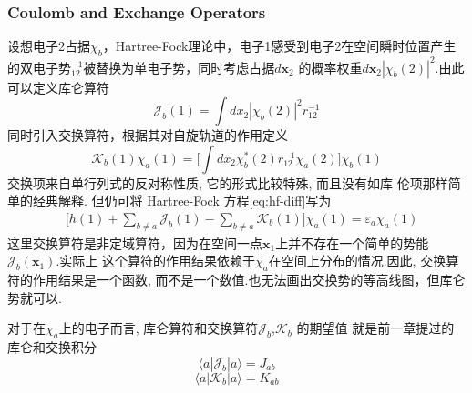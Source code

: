 \documentclass[fontset=none,12pt,a4paper]{ctexart}
\numberwithin{equation}{section}
\begin{document}
\subsubsection{Coulomb and Exchange Operators}
设想电子2占据$\chi_b$，Hartree-Fock理论中，电子1感受到电子2在空间瞬时位置产生的双电子势$_{12}^{-1}$被替换为单电子势，同时考虑占据$d\mathbf{x}_2$
的概率权重$d\mathbf{x}_2|\chi_b(2)|^2$.由此可以定义库仑算符
\begin{equation}
  \mathcal{J}_b(1)=\int dx_2|\chi_b(2)|^{2}r_{12}^{-1}
  \label{eq:coulombo}
\end{equation}
同时引入交换算符，根据其对自旋轨道的作用定义
\begin{equation}
  \mathcal{K}_b(1)\chi_a(1)=\biggl[\int dx_2\chi_b^*(2)r_{12}^{-1}\chi_a(2)\biggr]\chi_b(1)
  \label{eq:exchangeo}
\end{equation}
交换项来自单行列式的反对称性质, 它的形式比较特殊, 而且没有如库 伦项那样简单的经典解释. 但仍可将 Hartree-Fock 方程\eqref{eq:hf-diff}写为
\begin{equation}
  \begin{split}
    &\biggl[ h(1)+\sum_{b\neq a}\mathcal{J}_b(1)-\sum_{b\neq a}\mathcal{K}_b(1)\biggr]\chi_a(1)=\varepsilon_a\chi_a(1)
  \end{split}
\end{equation}
这里交换算符是非定域算符，因为在空间一点$\mathbf{x}_1$上并不存在一个简单的势能$\mathcal{J}_b(\mathbf{x}_1)$.实际上
这个算符的作用结果依赖于$\chi_a$在空间上分布的情况.因此, 交换算符的作用结果是一个函数, 而不是一个数值.也无法画出交换势的等高线图，但库仑势就可以.

对于在$\chi_a$上的电子而言, 库仑算符和交换算符$\mathcal{J}_b$,$\mathcal{K}_b$ 的期望值 就是前一章提过的库仑和交换积分
\begin{equation}
  \langle a|\mathcal{J}_b|a\rangle=J_{ab}
\end{equation}
\begin{equation}  
  \langle a|\mathcal{K}_b|a\rangle=K_{ab}
\end{equation}
\end{document}
